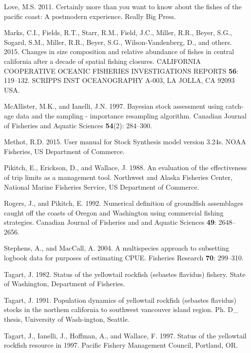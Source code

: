 \documentclass[12pt,]{article}
\begin{document}
\hypertarget{ref-Love2011}{}
Love, M.S. 2011. Certainly more than you want to know about the fishes
of the pacific coast: A postmodern experience. Really Big Press.

\hypertarget{ref-Marks2015}{}
Marks, C.I., Fields, R.T., Starr, R.M., Field, J.C., Miller, R.R.,
Beyer, S.G., Sogard, S.M., Miller, R.R., Beyer, S.G., Wilson-Vandenberg,
D., and others. 2015. Changes in size composition and relative abundance
of fishes in central california after a decade of spatial fishing
closures. CALIFORNIA COOPERATIVE OCEANIC FISHERIES INVESTIGATIONS
REPORTS \textbf{56}: 119--132. SCRIPPS INST OCEANOGRAPHY A-003, LA
JOLLA, CA 92093 USA.

\hypertarget{ref-McAllister1997}{}
McAllister, M.K., and Ianelli, J.N. 1997. Bayesian stock assessment
using catch-age data and the sampling - importance resampling algorithm.
Canadian Journal of Fisheries and Aquatic Sciences \textbf{54}(2):
284--300.

\hypertarget{ref-Methot2015}{}
Methot, R.D. 2015. User manual for Stock Synthesis model version 3.24s.
NOAA Fisheries, US Department of Commerce.

\hypertarget{ref-Pikitch1988}{}
Pikitch, E., Erickson, D., and Wallace, J. 1988. An evaluation of the
effectiveness of trip limits as a management tool. Northwest and Alaska
Fisheries Center, National Marine Fisheries Service, US Department of
Commerce.

\hypertarget{ref-Rogers1992}{}
Rogers, J., and Pikitch, E. 1992. Numerical definition of groundfish
assemblages caught off the coasts of Oregon and Washington using
commercial fishing strategies. Canadian Journal of Fisheries and and
Aquatic Sciences \textbf{49}: 2648--2656.

\hypertarget{ref-Stephens2004}{}
Stephens, A., and MacCall, A. 2004. A multispecies approach to
subsetting logbook data for purposes of estimating CPUE. Fisheries
Research \textbf{70}: 299--310.

\hypertarget{ref-Tagart1982}{}
Tagart, J. 1982. Status of the yellowtail rockfish (sebastes flavidus)
fishery. State of Washington, Department of Fisheries.

\hypertarget{ref-Tagart1991}{}
Tagart, J. 1991. Population dynamics of yellowtail rockfish (sebastes
flavidus) stocks in the northem california to southwest vancouver island
region. Ph. D\_ thesis, University of Wash-ington, Seattle.

\hypertarget{ref-Tagart1997}{}
Tagart, J., Ianelli, J., Hoffman, A., and Wallace, F. 1997. Status of
the yellowtail rockfish resource in 1997. Pacific Fishery Management
Council, Portland, OR.
\end{document}
